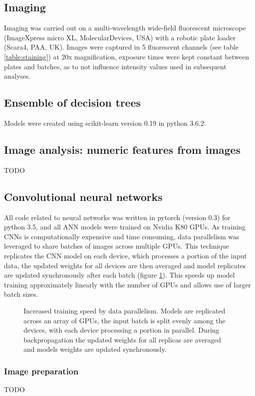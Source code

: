\documentclass[a4paper,11pt,twoside,openright]{scrbook}
\begin{document}
\subsection{Imaging}
Imaging was carried out on a multi-wavelength wide-field fluorescent microscope (ImageXpress micro XL, MolecularDevices, USA) with a robotic plate loader (Scara4, PAA, UK).
Images were captured in 5 fluorescent channels (see table \ref{table:staining}) at 20x magnification, exposure times were kept constant between plates and batches, as to not influence intensity values used in subsequent analyses.


\subsection{Ensemble of decision trees}
Models were created using scikit-learn version 0.19 in python 3.6.2.

\subsection{Image analysis: numeric features from images}
TODO

\subsection{Convolutional neural networks}


All code related to neural networks was written in pytorch (version 0.3) for python 3.5, and all ANN models were trained on Nvidia K80 GPUs.
As training CNNs is computationally expensive and time consuming, data parallelism was leveraged to share batches of images across multiple GPUs.
This technique replicates the CNN model on each device, which processes a portion of the input data, the updated weights for all devices are then averaged and model replicates are updated synchronously after each batch (figure \ref{figure:multi_GPU}).
This speeds up model training approximately linearly with the number of GPUs and allows use of larger batch sizes.

\begin{figure}
    \captionsetup{width=0.8\textwidth}
    \caption[Multi-GPU distributed training]{Increased training speed by data parallelism. Models are replicated across an array of GPUs, the input batch is split evenly among the devices, with each device processing a portion in parallel. During backpropagation the updated weights for all replicas are averaged and models weights are updated synchronously.}
    
    \label{figure:multi_GPU}
\end{figure}





\subsubsection{Image preparation}
TODO


\end{document}
